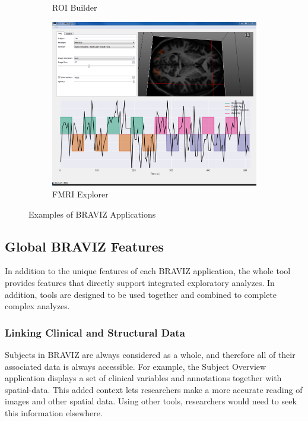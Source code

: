 \documentclass[twocolumn]{svjour3}
\begin{document}
\begin{figure}
\begin{center}
\begin{subfigure}[b]{0.22\linewidth}
\caption{ROI Builder\label{fig_roi}}
\end{subfigure}\hfill
\begin{subfigure}[b]{0.18\linewidth}
\includegraphics[width=\textwidth]{figures/fmri}
\caption{FMRI Explorer\label{fig_fmri}}
\end{subfigure}
\end{center}
 \caption{\label{fig_other_apps} Examples of BRAVIZ Applications}
\end{figure}



\subsection{Global BRAVIZ Features}

In addition to the unique features of each BRAVIZ application, the whole tool provides features that directly support integrated exploratory analyzes. In addition, tools are designed to be used together and combined to complete complex analyzes.

\subsubsection{Linking Clinical and Structural Data}

Subjects in BRAVIZ are always considered as a whole, and therefore all of their associated data is always accessible. For example, the Subject Overview application displays a set of clinical variables and annotations together with spatial-data. This added context lets researchers make a more accurate reading of images and other spatial data. Using other tools, researchers would need to seek this information elsewhere. 
\end{document}
